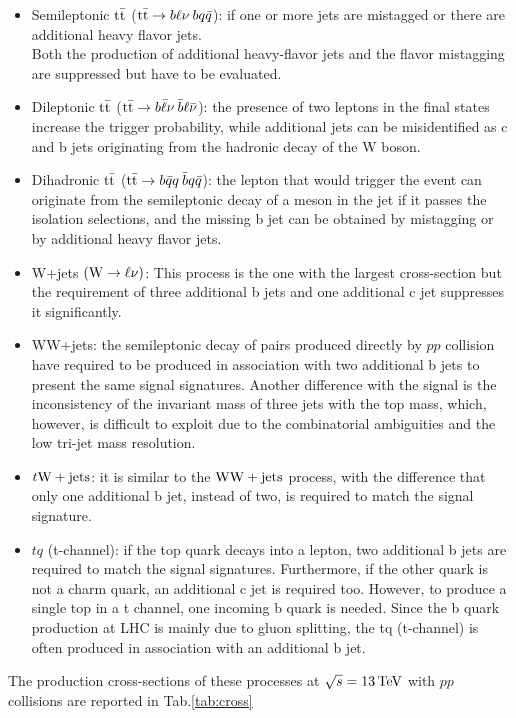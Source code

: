 \begin{itemize}
    \item Semileptonic ${{\text{t}}{\bar{\text{t}}}}$ (${{\text{t}}{\bar{\text{t}}}}\to b\ell\nu \: bq\bar{q}$): if one or more jets are mistagged or there are additional heavy flavor jets.\\
    Both the production of additional heavy-flavor jets and the flavor mistagging are suppressed but have to be evaluated.
    \item Dileptonic ${{\text{t}}{\bar{\text{t}}}}$ (${{\text{t}}{\bar{\text{t}}}} \to b\bar{\ell}\nu \: \bar{b}\ell\bar{\nu}$): the presence of two leptons in the final states increase the trigger probability, while additional jets can be misidentified as c and b jets originating from the hadronic decay of the W boson.
    \item Dihadronic ${{\text{t}}{\bar{\text{t}}}}$ (${{\text{t}}{\bar{\text{t}}}} \to b\bar{q}q \: \bar{b}q\bar{q}$): the lepton that would trigger the event can originate from the semileptonic decay of a meson in the jet if it passes the isolation selections, and the missing b jet can be obtained by mistagging or by additional heavy flavor jets.
    \item W+jets $({\text{W}} \to \ell \nu)$: This process is the one with the largest cross-section but the requirement of three additional b jets and one additional c jet suppresses it significantly.
    \item WW+jets: the semileptonic decay of \PW\PW pairs produced directly by $pp$ collision have required to be produced in association with two additional b jets to present the same signal signatures. Another difference with the signal is the inconsistency of the invariant mass of three jets with the top mass, which, however, is difficult to exploit due to the combinatorial ambiguities and the low tri-jet mass resolution.  
    \item $t{\text{W}}+\text{jets}$: it is similar to the ${\text{W}} {\text{W}} + \text{jets}$ process, with the difference that only one additional b jet, instead of two, is required to match the signal signature.
    \item $tq$ (t-channel): if the     
    top quark decays into a lepton,
    two additional b jets are required to match the signal signatures.   
    Furthermore, if the other quark is not a charm quark, an additional c jet is required too. However, to produce a single top in a t channel, one incoming b quark is needed. Since the b quark production at LHC is mainly due to gluon splitting, the tq (t-channel) is often produced in association with an additional b jet.  
\end{itemize}
The production cross-sections of these processes  at $\sqrt{s}=13{\,\text{Te\hspace{-.08em}V}}$ with $pp$ collisions are reported in Tab.\ref{tab:cross}


